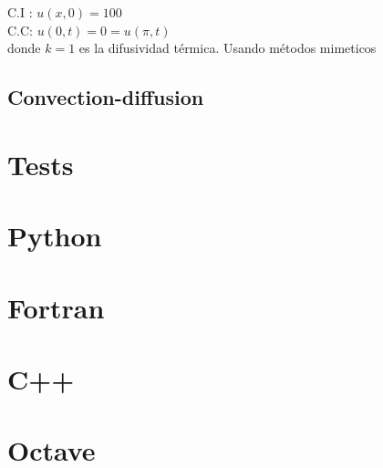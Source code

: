 \documentclass[a4paper,abstract=true]{scrreprt}
\begin{document}
C.I : $u(x,0) = 100$\\

C.C:  $u(0,t)=0 =u(\pi,t)$\\

donde $ k =1$ es la difusividad térmica.
Usando métodos mimeticos 


\section{Convection-diffusion}

\chapter{Tests}

\chapter{Python}

\chapter{Fortran}

\chapter{C++}

\chapter{Octave}
\end{document}

